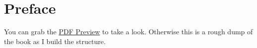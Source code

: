 \chapter{Preface}

You can grab the \href{http://learncodethehardway.org/LearnCTheHardWay-preview.pdf}{PDF Preview}
to take a look.  Otherwise this is a rough dump of the book as I build the structure.
